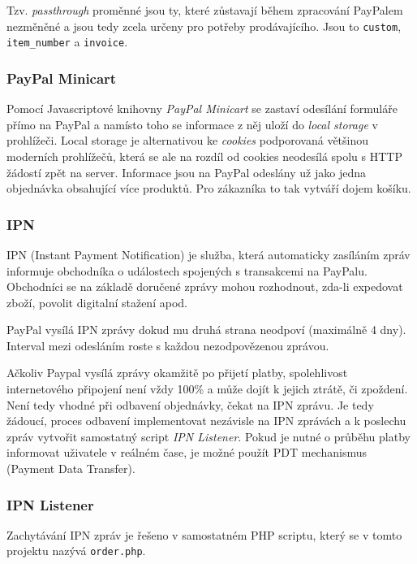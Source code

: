 \documentclass[12pt]{article}
\begin{document}
Tzv. \emph{passthrough} proměnné jsou ty, které zůstavají během zpracování PayPalem nezměněné a jsou tedy zcela určeny pro potřeby prodávajícího. Jsou to \texttt{custom}, \texttt{item\_number} a \texttt{invoice}.

\subsubsection{PayPal Minicart}

Pomocí Javascriptové knihovny \emph{PayPal Minicart} se zastaví odesílání formuláře přímo na PayPal a namísto toho se informace z něj uloží do \emph{local storage} v prohlížeči. Local storage je alternativou ke \emph{cookies} podporovaná většinou moderních prohlížečů, která se ale na rozdíl od cookies neodesílá spolu s HTTP žádostí zpět na server.  Informace jsou na PayPal odeslány už jako jedna objednávka obsahující více produktů. Pro zákazníka to tak vytváří dojem košíku.

\subsubsection{IPN} \label{ipn}

IPN (Instant Payment Notification) je služba, která automaticky zasíláním zpráv informuje obchodníka o událostech spojených s transakcemi na PayPalu. Obchodníci se na základě doručené zprávy mohou rozhodnout, zda-li expedovat zboží, povolit digitalní stažení apod.

PayPal vysílá IPN zprávy dokud mu druhá strana neodpoví (maximálně 4 dny). Interval mezi odesláním roste s každou nezodpovězenou zprávou.

Ačkoliv Paypal vysílá zprávy okamžitě po přijetí platby, spolehlivost internetového připojení není vždy 100\% a může dojít k jejich ztrátě, či zpoždení. Není tedy vhodné při odbavení objednávky, čekat na IPN zprávu. Je tedy žádoucí, proces odbavení implementovat nezávisle na IPN zprávách a k poslechu zpráv vytvořit samostatný script \emph{IPN Listener}. Pokud je nutné o průběhu platby informovat uživatele v reálném čase, je možné použít PDT mechanismus (Payment Data Transfer\cite{ppdocs}).

\subsubsection{IPN Listener}

Zachytávání IPN zpráv je řešeno v samostatném PHP scriptu, který se v tomto projektu nazývá \texttt{order.php}.
\end{document}
